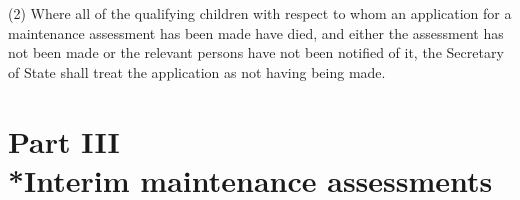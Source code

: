 \documentclass[a4paper,12pt]{article}
\begin{document}
(2) Where all of the qualifying children with respect to whom an application for a maintenance assessment has been made have died, and either the assessment has not been made or the relevant persons have not been notified of it, 
the Secretary of State  %
shall treat the application as not having being made.


\section[Part III --- Interim maintenance assessments]{Part III\\*Interim maintenance assessments}

\renewcommand\parthead{--- Part III}
\end{document}
